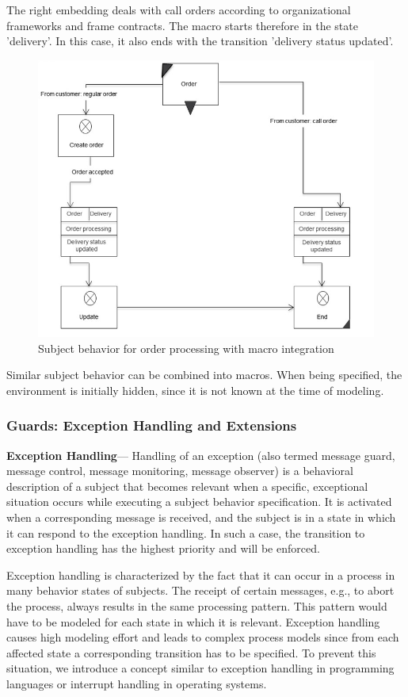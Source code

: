 The right embedding deals with call orders according to organizational frameworks and frame contracts. The macro starts therefore in the state 'delivery'. In this case, it also ends with the transition 'delivery status updated'.

\begin{figure}[htbp]
	\centering
	\includegraphics[width=0.6\linewidth]{Figures/Ontology/SubjectExecution/MacroUsage}
	\caption[Subject behavior for order processing with macro integration]{Subject behavior for order processing with macro integration}
	\label{fig:macrousage}
\end{figure}

Similar subject behavior can be combined into macros. When being specified, the environment is initially hidden, since it is not known at the time of modeling.

\subsubsection{Guards: Exception Handling and Extensions} 

\textbf{Exception Handling}---
Handling of an exception (also termed message guard, message control, message monitoring, message observer) is a behavioral description of a subject that becomes relevant when a specific, exceptional situation occurs while executing a subject behavior specification. It is activated when a corresponding message is received, and the subject is in a state in which it can respond to the exception handling. In such a case, the transition to exception handling has the highest priority and will be enforced.

Exception handling is characterized by the fact that it can occur in a process in many behavior states of subjects. The receipt of certain messages, e.g., to abort the process, always results in the same processing pattern. This pattern would have to be modeled for each state in which it is relevant. Exception handling causes high modeling effort and leads to complex process models since from each affected state a corresponding transition has to be specified. To prevent this situation, we introduce a concept similar to exception handling in programming languages or interrupt handling in operating systems.

